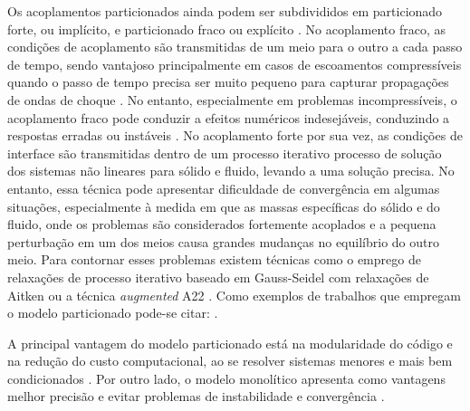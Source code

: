 Os acoplamentos particionados ainda podem ser subdivididos em particionado forte, ou implícito, e particionado fraco ou explícito \cite{Felippaetal2001}. No acoplamento fraco, as condições de acoplamento são transmitidas de um meio para o outro a cada passo de tempo, sendo vantajoso principalmente em casos de escoamentos compressíveis quando o passo de tempo precisa ser muito pequeno para capturar propagações de ondas de choque \cite{sanches2011acoplamento,sanches2014fluid,sanches2013unconstrained}. No entanto, especialmente em problemas incompressíveis, o acoplamento fraco pode conduzir a efeitos numéricos indesejáveis, conduzindo a respostas erradas ou instáveis \cite{Felippaetal2001, fernandes2019ale}. No acoplamento forte por sua vez, as condições de interface são transmitidas dentro de um processo iterativo processo de solução dos sistemas não lineares para sólido e fluido, levando a uma solução precisa. No entanto, essa técnica pode apresentar dificuldade de convergência em algumas situações, especialmente à medida em que as massas específicas do sólido e do fluido, onde os problemas são considerados fortemente acoplados e a pequena perturbação em um dos meios causa grandes mudanças no equilíbrio do outro meio. Para contornar esses problemas existem técnicas como o emprego de relaxações de processo iterativo baseado em Gauss-Seidel com relaxações de Aitken \cite{fernandes2019ale} ou a técnica \textit{augmented} A22 \cite{tezduyar2005finite}. Como exemplos de trabalhos que empregam o modelo particionado pode-se citar: .

A principal vantagem do modelo particionado está na modularidade do código e na redução do custo computacional, ao se resolver sistemas menores e mais bem condicionados \cite{sanches2011acoplamento,fernandes2020tecnica}. Por outro lado, o modelo monolítico apresenta como vantagens melhor precisão e evitar problemas de instabilidade e convergência \cite{Acanvini2023formulacao}.